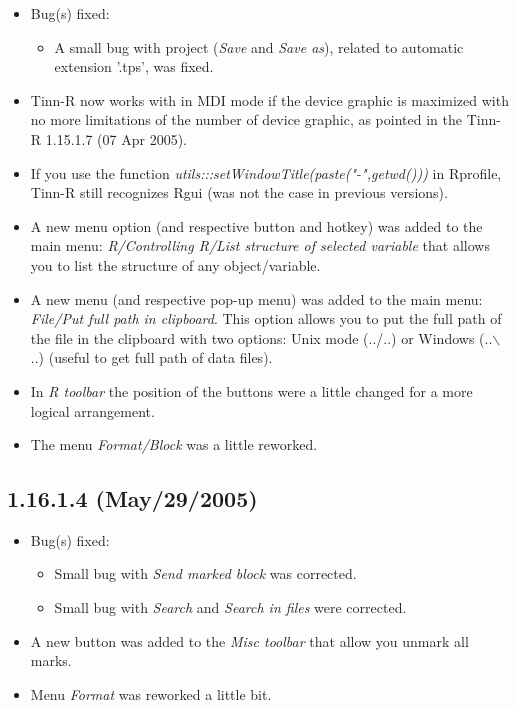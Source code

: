 \begin{itemize}
  \item Bug(s) fixed:
    \begin{itemize}
      \item A small bug with project (\textit{Save} and \textit{Save as}),
        related to automatic extension '.tps', was fixed.
    \end{itemize}
  \item Tinn-R now works with \RR{} in MDI mode if the device graphic is
    maximized with no more limitations of the number of device graphic,
    as pointed in the Tinn-R 1.15.1.7 (07 Apr 2005).
  \item If you use the function \textit{utils:::setWindowTitle(paste("-",getwd()))}
    in Rprofile, Tinn-R still recognizes Rgui (was not the case in
    previous versions).
  \item A new menu option (and respective button and hotkey) was added to
    the main menu: \textit{R/Controlling R/List structure of selected variable}
    that allows you to list the structure of any \RR{} object/variable.
  \item A new menu (and respective pop-up menu) was added to the main menu:
    \textit{File/Put full path in clipboard}. This option allows you to
    put the full path of the file in the clipboard with two options: Unix
    mode (../..) or Windows (..$\backslash$..) (useful to get full path
    of data files).
  \item In \textit{R toolbar} the position of the buttons were a little changed
    for a more logical arrangement.
  \item The menu \textit{Format/Block} was a little reworked.
\end{itemize}


\subsection{1.16.1.4 (May/29/2005)}

\begin{itemize}
  \item Bug(s) fixed:
    \begin{itemize}
      \item Small bug with \textit{Send marked block} was corrected.
      \item Small bug with \textit{Search} and \textit{Search in files}
        were corrected.
    \end{itemize}
  \item A new button was added to the \textit{Misc toolbar} that allow
    you unmark all marks.
  \item Menu \textit{Format}  was reworked a little bit.
\end{itemize}



